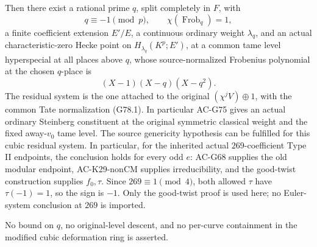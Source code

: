 \begin{theorem}
Then there exist a rational prime \(q\), split completely in
\(F\), with
\[
 q\equiv-1\pmod p,\qquad \chi(\operatorname{Frob}_q)=1,
 \tag{G78.5}
\]
a finite coefficient extension \(E'/E\), a continuous ordinary
weight \(\lambda_q\), and an actual characteristic-zero Hecke
point on \(H_{\lambda_q}(K^p;E')\), at a common tame level
hyperspecial at all places above \(q\), whose source-normalized
Frobenius polynomial at the chosen \(q\)-place is
\[
                       (X-1)(X-q)(X-q^2).             \tag{G78.6}
\]
The residual system is the one attached to the original
\((\chi^j V)\oplus1\), with the common Tate normalization (G78.1).
In particular AC-G75 gives an actual ordinary Steinberg
constituent at the original symmetric classical weight and
the fixed away-\(v_0\) tame level.
The source genericity hypothesis can be fulfilled for this
cubic residual system.
In particular, for the inherited actual \(269\)-coefficient
Type II endpoints, the conclusion holds for every odd \(e\):
AC-G68 supplies the old modular endpoint, AC-K29-nonCM supplies
irreducibility, and the good-twist construction supplies \(f_0,\tau\).
Since \(269\equiv1\pmod4\), both allowed \(\tau\) have
\(\tau(-1)=1\), so the sign is \(-1\).
Only the good-twist proof is used here; no Euler-system conclusion
at \(269\) is imported.

No bound on \(q\), no original-level descent, and no
per-curve containment in the modified cubic deformation ring
is asserted.
\end{theorem}

